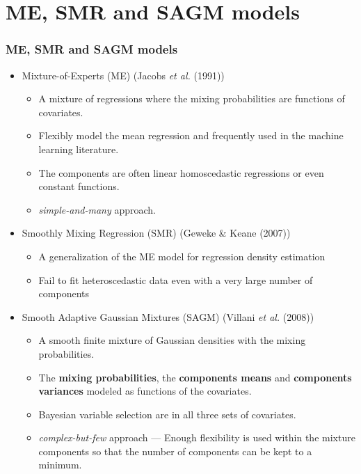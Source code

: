 \documentclass[10pt]{beamer}
\begin{document}
\section{ME, SMR and SAGM models} 
\begin{frame}
\frametitle{ME, SMR and SAGM models}

\begin{itemize}

\item Mixture-of-Experts (ME) (Jacobs \emph{et al.} (1991))
  \begin{itemize}
    \item A mixture of regressions where the mixing probabilities are functions of
      covariates.
    \item Flexibly model the mean regression and frequently used in the machine learning literature.   
    \item The components are often linear homoscedastic regressions or even constant functions. 
    \item \textit{simple-and-many} approach.  
    \end{itemize}


\item Smoothly Mixing Regression (SMR) (Geweke \& Keane (2007))
  \begin{itemize}
  \item A generalization of the ME model for regression density estimation 
  \item Fail to fit heteroscedastic data even with a very large number of components
  \end{itemize}

\item Smooth Adaptive Gaussian Mixtures (SAGM) (Villani \emph{et al.} (2008))
\begin{itemize}
\item A smooth finite mixture of Gaussian densities with the mixing probabilities.
\item The \textbf{mixing probabilities}, the \textbf{components means} and \textbf{components variances} modeled as functions of the
covariates.
\item Bayesian variable selection are in all three sets of covariates. 
\item  \textit{complex-but-few} approach --- Enough flexibility is used within the mixture
  components so that the number of  components can be kept  to a minimum. 

\end{itemize}

\end{itemize}
\end{frame}
\end{document}
